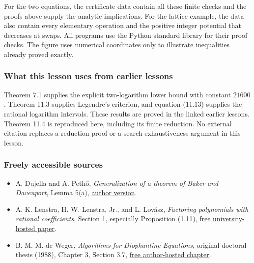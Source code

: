 \documentclass[
  11pt,
  a4paper,
]{article}
\providecommand{\tightlist}{%
  \setlength{\itemsep}{0pt}\setlength{\parskip}{0pt}}
\begin{document}
For the two equations, the certificate data contain all these finite
checks and the proofs above supply the analytic implications. For the
lattice example, the data also contain every elementary operation and
the positive integer potential that decreases at swaps. All programs use
the Python standard library for their proof checks. The figure uses
numerical coordinates only to illustrate inequalities already proved
exactly.

\subsubsection{What this lesson uses from earlier
lessons}\label{what-this-lesson-uses-from-earlier-lessons}

Theorem 7.1 supplies the explicit two-logarithm lower bound with
constant \(21600\). Theorem 11.3 supplies Legendre's criterion, and
equation (11.13) supplies the rational logarithm intervals. These
results are proved in the linked earlier lessons. Theorem 11.4 is
reproduced here, including its finite reduction. No external citation
replaces a reduction proof or a search exhaustiveness argument in this
lesson.

\subsubsection{Freely accessible
sources}\label{freely-accessible-sources}

\begin{itemize}
\tightlist
\item
  A. Dujella and A. Pethő, \emph{Generalization of a theorem of Baker
  and Davenport}, Lemma 5(a),
  \href{https://web.math.pmf.unizg.hr/~duje/pdf/qjm.pdf}{author
  version}.
\item
  A. K. Lenstra, H. W. Lenstra, Jr., and L. Lovász, \emph{Factoring
  polynomials with rational coefficients}, Section 1, especially
  Proposition (1.11),
  \href{https://www.math.ucdavis.edu/~deloera/MISC/LA-BIBLIO/trunk/Lovasz/LovaszLenstraLenstrafactor.pdf}{free
  university-hosted paper}.
\item
  B. M. M. de Weger, \emph{Algorithms for Diophantine Equations},
  original doctoral thesis (1988), Chapter 3, Section 3.7,
  \href{https://math.deweger.net/proefschrift/proefschrift-hoofdstuk3.pdf}{free
  author-hosted chapter}.
\end{itemize}
\end{document}
